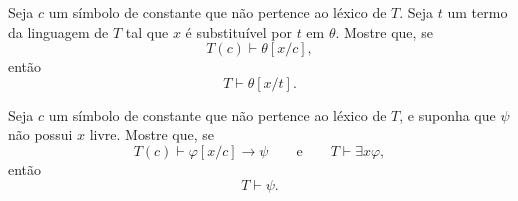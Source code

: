\begin{exercise}
    Seja $c$ um símbolo de constante que não pertence ao léxico de $T$.
    Seja $t$ um termo da linguagem de $T$ tal que $x$ é substituível por $t$ em $\theta$.
    Mostre que, se
    \[
        T(c)\vdash \theta[x/c],
    \]
    então
    \[
        T\vdash \theta[x/t].
    \]
\end{exercise}

\begin{exercise}
    Seja $c$ um símbolo de constante que não pertence ao léxico de $T$, e suponha que $\psi$ não possui $x$ livre.
    Mostre que, se
    \[
        T(c)\vdash \varphi[x/c]\rightarrow\psi
        \qquad\text{e}\qquad
        T\vdash \exists x\varphi,
    \]
    então
    \[
        T\vdash \psi.
    \]
\end{exercise}
